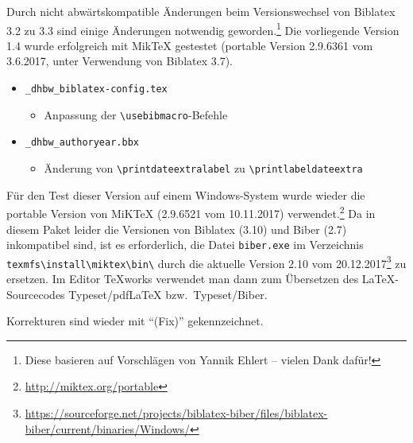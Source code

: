 \label{anhang:ReleaseNotes14}
Durch nicht abwärtskompatible Änderungen beim Versionswechsel von Biblatex 3.2 zu 3.3 sind einige Änderungen notwendig geworden.\footnote{Diese basieren auf Vorschlägen von Yannik Ehlert -- vielen Dank dafür!}
Die vorliegende Version 1.4 wurde erfolgreich mit MikTeX gestestet (portable Version 2.9.6361 vom 3.6.2017, unter Verwendung von Biblatex 3.7).

\begin{itemize}
\item \verb|_dhbw_biblatex-config.tex|
\begin{itemize}
\item Anpassung der \verb|\usebibmacro|-Befehle
\end{itemize}

\item \verb|_dhbw_authoryear.bbx|
\begin{itemize}
\item  Änderung von \verb|\printdateextralabel| zu \verb|\printlabeldateextra|
\end{itemize}
\end{itemize}

\label{anhang:ReleaseNotes15}
Für den Test dieser Version auf einem Windows-System wurde wieder die portable Version von MiKTeX (2.9.6521 vom 10.11.2017) verwendet.\footnote{\url{http://miktex.org/portable}} Da in diesem Paket leider die Versionen von Biblatex (3.10) und Biber (2.7) inkompatibel sind, ist es erforderlich, die Datei \verb|biber.exe| im Verzeichnis \verb|texmfs\install\miktex\bin\| durch die aktuelle Version 2.10 vom 20.12.2017\footnote{\url{https://sourceforge.net/projects/biblatex-biber/files/biblatex-biber/current/binaries/Windows/}} zu ersetzen. Im Editor TeXworks verwendet man dann zum Übersetzen des \LaTeX-Sourcecodes Typeset/pdfLaTeX bzw.\ Typeset/Biber.

Korrekturen sind wieder mit \enquote{(Fix)} gekennzeichnet.


